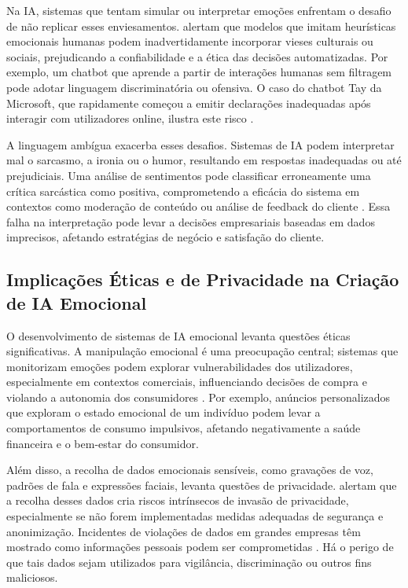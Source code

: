 \documentclass[a4paper,12pt]{report}
\begin{document}
	Na IA, sistemas que tentam simular ou interpretar emoções enfrentam o desafio de não replicar esses enviesamentos. \textcite{russell2020} alertam que modelos que imitam heurísticas emocionais humanas podem inadvertidamente incorporar vieses culturais ou sociais, prejudicando a confiabilidade e a ética das decisões automatizadas. Por exemplo, um chatbot que aprende a partir de interações humanas sem filtragem pode adotar linguagem discriminatória ou ofensiva. O caso do chatbot Tay da Microsoft, que rapidamente começou a emitir declarações inadequadas após interagir com utilizadores online, ilustra este risco \parencite{neff2016}.
	
	A linguagem ambígua exacerba esses desafios. Sistemas de IA podem interpretar mal o sarcasmo, a ironia ou o humor, resultando em respostas inadequadas ou até prejudiciais. Uma análise de sentimentos pode classificar erroneamente uma crítica sarcástica como positiva, comprometendo a eficácia do sistema em contextos como moderação de conteúdo ou análise de feedback do cliente \parencite{slovic2007}. Essa falha na interpretação pode levar a decisões empresariais baseadas em dados imprecisos, afetando estratégias de negócio e satisfação do cliente.
	
	\subsection{Implicações Éticas e de Privacidade na Criação de IA Emocional}
	
	O desenvolvimento de sistemas de IA emocional levanta questões éticas significativas. A manipulação emocional é uma preocupação central; sistemas que monitorizam emoções podem explorar vulnerabilidades dos utilizadores, especialmente em contextos comerciais, influenciando decisões de compra e violando a autonomia dos consumidores \parencite{pessoa2008}. Por exemplo, anúncios personalizados que exploram o estado emocional de um indivíduo podem levar a comportamentos de consumo impulsivos, afetando negativamente a saúde financeira e o bem-estar do consumidor.
	
	Além disso, a recolha de dados emocionais sensíveis, como gravações de voz, padrões de fala e expressões faciais, levanta questões de privacidade. \textcite{loewenstein2001} alertam que a recolha desses dados cria riscos intrínsecos de invasão de privacidade, especialmente se não forem implementadas medidas adequadas de segurança e anonimização. Incidentes de violações de dados em grandes empresas têm mostrado como informações pessoais podem ser comprometidas \parencite{solove2013}. Há o perigo de que tais dados sejam utilizados para vigilância, discriminação ou outros fins maliciosos.
	
\end{document}
